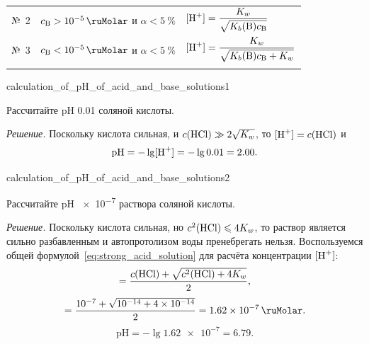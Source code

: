 \begin{table}[htbp]
\begin{tabularx}{\textwidth}{
        >{\hsize}Z
        >{\hsize}Z
        >{\hsize}Z
        }
        \noalign{\vspace{2pt}}
        \hline
        \noalign{\vspace{2pt}}
        №~2 & $c_{\text{B}} > \qty{e-5}{\ruMolar}$ и $\alpha < \qty{5}{\percent}$ & $\displaystyle [\ce{H^+}] = \dfrac{K_w}{\sqrt{K_b(\text{B})c_{\text{B}}}}$ \\
        \noalign{\vspace{2pt}}
        \hline
        \noalign{\vspace{2pt}}
        №~3 & $c_{\text{B}} < \qty{e-5}{\ruMolar}$ и $\alpha < \qty{5}{\percent}$ & $\displaystyle [\ce{H^+}] = \dfrac{K_w}{\sqrt{K_b(\text{B})c_{\text{B}} + K_w}}$ \\
        \noalign{\vspace{2pt}}
        \hline
    \end{tabularx}
\end{table}

\begin{example}{}{calculation_of_pH_of_acid_and_base_solutions1}
    \begin{condition}
        Рассчитайте pH \qty{0,01}{\ruMolar} соляной кислоты.
    \end{condition}

    \medskip

    \textit{Решение.} Поскольку кислота сильная, и $c(\ce{HCl}) \gg 2\sqrt{K_w}$, то $[\ce{H^+}] = c(\ce{HCl})$ и
    \begin{equation*}
        \text{pH} = -\lg[\ce{H^+}] = -\lg\num{0,01} = \num{2,00}.
    \end{equation*}
\end{example}

\begin{example}{}{calculation_of_pH_of_acid_and_base_solutions2}
    \begin{condition}
        Рассчитайте pH \qty{e-7}{\ruMolar} раствора соляной кислоты.
    \end{condition}

    \medskip

    \textit{Решение.} Поскольку кислота сильная, но $c^2(\ce{HCl}) \leqslant 4K_w$, то раствор является сильно разбавленным и автопротолизом воды пренебрегать нельзя. Воспользуемся общей формулой~\eqref{eq:strong_acid_solution} для расчёта концентрации $[\ce{H^+}]$:
    \begin{equation*}
        [\ce{H^+}] = \frac{c(\ce{HCl}) + \sqrt{c^2(\ce{HCl}) + 4K_w}}{2},
    \end{equation*}
    \begin{equation*}
        [\ce{H^+}] = \frac{\num{e-7} + \sqrt{\num{e-14} + \num{4e-14}}}{2} = \qty{1,62e-7}{\ruMolar}.
    \end{equation*}
    \begin{equation*}
        \text{pH} = -\lg\num{1,62e-7} = \num{6,79}.
    \end{equation*}
\end{example}

